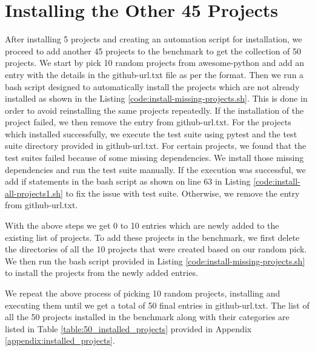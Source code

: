 \section{Installing the Other 45 Projects}
\label{impl:size to 50}
After installing 5 projects and creating an automation script for installation, we proceed to add another 45 projects to the benchmark to get the collection of 50 projects.
We start by pick 10 random projects from awesome-python and add an entry with the details in the github-url.txt file as per the format.
Then we run a bash script designed to automatically install the projects which are not already installed as shown in the Listing \ref{code:install-missing-projects.sh}.
This is done in order to avoid reinstalling the same projects repeatedly.
If the installation of the project failed, we then remove the entry from github-url.txt.
For the projects which installed successfully, we execute the test suite using pytest and the test suite directory provided in github-url.txt.
For certain projects, we found that the test suites failed because of some missing dependencies.
We install those missing dependencies and run the test suite manually.
If the execution was successful, we add if statements in the bash script as shown on line 63 in Listing \ref{code:install-all-projects1.sh} to fix the issue with test suite.
Otherwise, we remove the entry from github-url.txt.

With the above steps we get 0 to 10 entries which are newly added to the existing list of projects.
To add these projects in the benchmark, we first delete the directories of all the 10 projects that were created based on our random pick.
We then run the bash script provided in Listing \ref{code:install-missing-projects.sh} to install the projects from the newly added entries.

We repeat the above process of picking 10 random projects, installing and executing them until we get a total of 50 final entries in github-url.txt.
The list of all the 50 projects installed in the benchmark along with their categories are listed in Table \ref{table:50_installed_projects} provided in Appendix \ref{appendix:installed_projects}.

